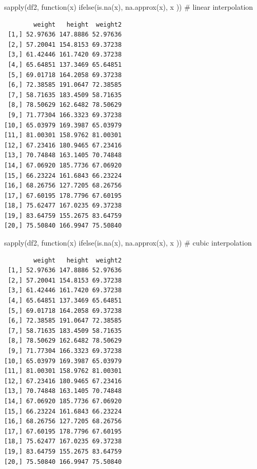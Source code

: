 \documentclass[
  letterpaper,
  DIV=11,
  numbers=noendperiod]{scrreprt}
\newenvironment{Shaded}{\begin{snugshade}}{\end{snugshade}}
\newcommand{\CommentTok}[1]{\textcolor[rgb]{0.37,0.37,0.37}{#1}}
\newcommand{\ControlFlowTok}[1]{\textcolor[rgb]{0.00,0.23,0.31}{#1}}
\newcommand{\FunctionTok}[1]{\textcolor[rgb]{0.28,0.35,0.67}{#1}}
\newcommand{\NormalTok}[1]{\textcolor[rgb]{0.00,0.23,0.31}{#1}}
\begin{document}
\begin{Shaded}
\begin{Highlighting}[]
\FunctionTok{sapply}\NormalTok{(df2, }\ControlFlowTok{function}\NormalTok{(x) }\FunctionTok{ifelse}\NormalTok{(}\FunctionTok{is.na}\NormalTok{(x), }\FunctionTok{na.approx}\NormalTok{(x), x )) }\CommentTok{\# linear interpolation}
\end{Highlighting}
\end{Shaded}

\begin{verbatim}
        weight   height  weight2
 [1,] 52.97636 147.8886 52.97636
 [2,] 57.20041 154.8153 69.37238
 [3,] 61.42446 161.7420 69.37238
 [4,] 65.64851 137.3469 65.64851
 [5,] 69.01718 164.2058 69.37238
 [6,] 72.38585 191.0647 72.38585
 [7,] 58.71635 183.4509 58.71635
 [8,] 78.50629 162.6482 78.50629
 [9,] 71.77304 166.3323 69.37238
[10,] 65.03979 169.3987 65.03979
[11,] 81.00301 158.9762 81.00301
[12,] 67.23416 180.9465 67.23416
[13,] 70.74848 163.1405 70.74848
[14,] 67.06920 185.7736 67.06920
[15,] 66.23224 161.6843 66.23224
[16,] 68.26756 127.7205 68.26756
[17,] 67.60195 178.7796 67.60195
[18,] 75.62477 167.0235 69.37238
[19,] 83.64759 155.2675 83.64759
[20,] 75.50840 166.9947 75.50840
\end{verbatim}

\begin{Shaded}
\begin{Highlighting}[]
\FunctionTok{sapply}\NormalTok{(df2, }\ControlFlowTok{function}\NormalTok{(x) }\FunctionTok{ifelse}\NormalTok{(}\FunctionTok{is.na}\NormalTok{(x), }\FunctionTok{na.approx}\NormalTok{(x), x )) }\CommentTok{\# cubic interpolation}
\end{Highlighting}
\end{Shaded}

\begin{verbatim}
        weight   height  weight2
 [1,] 52.97636 147.8886 52.97636
 [2,] 57.20041 154.8153 69.37238
 [3,] 61.42446 161.7420 69.37238
 [4,] 65.64851 137.3469 65.64851
 [5,] 69.01718 164.2058 69.37238
 [6,] 72.38585 191.0647 72.38585
 [7,] 58.71635 183.4509 58.71635
 [8,] 78.50629 162.6482 78.50629
 [9,] 71.77304 166.3323 69.37238
[10,] 65.03979 169.3987 65.03979
[11,] 81.00301 158.9762 81.00301
[12,] 67.23416 180.9465 67.23416
[13,] 70.74848 163.1405 70.74848
[14,] 67.06920 185.7736 67.06920
[15,] 66.23224 161.6843 66.23224
[16,] 68.26756 127.7205 68.26756
[17,] 67.60195 178.7796 67.60195
[18,] 75.62477 167.0235 69.37238
[19,] 83.64759 155.2675 83.64759
[20,] 75.50840 166.9947 75.50840
\end{verbatim}
\end{document}
